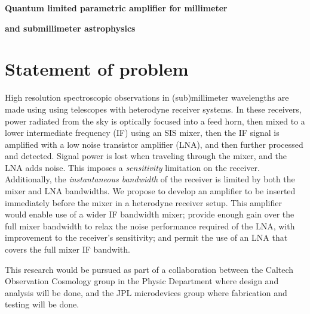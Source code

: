 






\centerline{\textbf{Quantum limited parametric amplifier for millimeter}}
\centerline{\textbf{and submillimeter astrophysics}}


\section{Statement of problem}
High resolution spectroscopic observations in (sub)millimeter wavelengths are made using using telescopes with heterodyne receiver systems. In these receivers, power radiated from the sky is optically focused into a feed horn, then mixed to a lower intermediate frequency (IF) using an SIS mixer, then the IF signal is amplified with a low noise transistor amplifier (LNA), and then further processed and detected. Signal power is lost when traveling through the mixer, and the LNA adds noise. This imposes a \emph{sensitivity} limitation on the receiver. Additionally, the \emph{instantaneous bandwidth} of the receiver is limited by both the mixer and LNA bandwidths. We propose to develop an amplifier to be inserted immediately before the mixer in a heterodyne receiver setup. This amplifier would enable use of a wider IF bandwidth mixer; provide enough gain over the full mixer bandwidth to relax the noise performance required of the LNA, with improvement to the receiver's sensitivity; and permit the use of an LNA that covers the full mixer IF bandwith.

This research would be pursued as part of a collaboration between the Caltech Observation Cosmology group in the Physic Department where design and analysis will be done, and the JPL microdevices group where fabrication and testing will be done.
   
